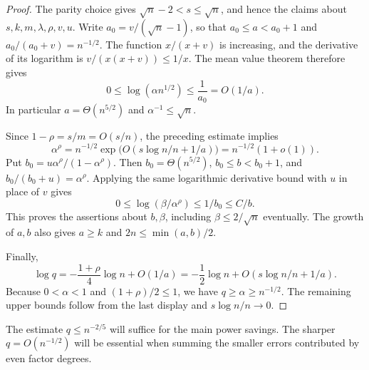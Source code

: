 \begin{proof}
The parity choice gives $\sqrt n-2<s\le\sqrt n$, and hence the
claims about $s,k,m,\lambda,\rho,v,u$.  Write
$a_0=v/(\sqrt n-1)$, so that $a_0\le a<a_0+1$ and
$a_0/(a_0+v)=n^{-1/2}$.  The function $x/(x+v)$ is increasing, and
the derivative of its logarithm is $v/(x(x+v))\le1/x$.
The mean value theorem therefore gives
\[
 0\le\log(\alpha n^{1/2})\le\frac1{a_0}=O(1/a).
\]
In particular $a=\Theta(n^{5/2})$ and $\alpha^{-1}\le\sqrt n$.

Since $1-\rho=s/m=O(s/n)$, the preceding estimate implies
\[
 \alpha^\rho
 =n^{-1/2}\exp\bigl(O(s\log n/n+1/a)\bigr)
 =n^{-1/2}(1+o(1)).
\]
Put $b_0=u\alpha^\rho/(1-\alpha^\rho)$.  Then
$b_0=\Theta(n^{5/2})$, $b_0\le b<b_0+1$, and
$b_0/(b_0+u)=\alpha^\rho$.  Applying the same logarithmic derivative
bound with $u$ in place of $v$ gives
\[
 0\le\log(\beta/\alpha^\rho)\le1/b_0\le C/b.
\]
This proves the assertions about $b,\beta$, including
$\beta\le2/\sqrt n$ eventually.  The growth of $a,b$ also gives
$a\ge k$ and $2n\le\min(a,b)/2$.

Finally,
\[
 \log q=-\frac{1+\rho}{4}\log n+O(1/a)
 =-\frac12\log n+O(s\log n/n+1/a).
\]
Because $0<\alpha<1$ and $(1+\rho)/2\le1$, we have
$q\ge\alpha\ge n^{-1/2}$.  The remaining upper bounds follow from
the last display and $s\log n/n\to0$.
\end{proof}

The estimate $q\le n^{-2/5}$ will suffice for the main power savings.
The sharper $q=O(n^{-1/2})$ will be essential when summing the
smaller errors contributed by even factor degrees.
